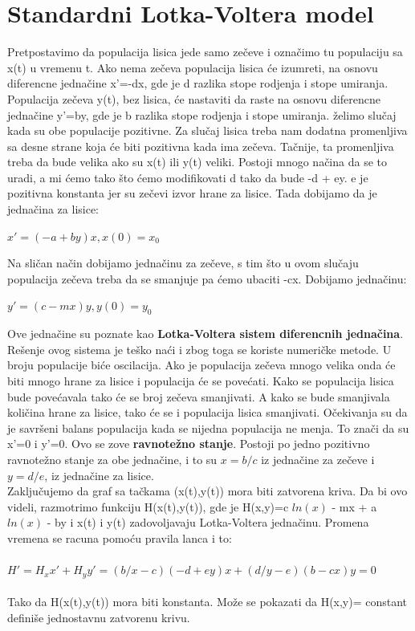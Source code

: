 \documentclass[a4paper]{article}
\begin{document}
\section{Standardni Lotka-Voltera model}
\label{sec:std_model}
Pretpostavimo da populacija lisica jede samo zečeve i označimo
tu populaciju sa x(t) u vremenu t.
Ako nema zečeva populacija lisica će izumreti, na
osnovu diferencne jednačine x'=-dx, gde je d razlika stope rodjenja i stope umiranja.
Populacija zečeva y(t), bez lisica, će nastaviti da raste na osnovu diferencne jednačine y'=by, gde je b razlika stope rodjenja i stope umiranja.
želimo slučaj kada su obe populacije pozitivne. Za slučaj lisica treba nam dodatna promenljiva
sa desne strane koja će biti pozitivna kada ima zečeva. Tačnije, ta promenljiva treba da bude velika ako su
x(t) ili y(t) veliki. Postoji mnogo načina da se to uradi, a mi ćemo tako što ćemo modifikovati d tako da bude
-d + ey. e je pozitivna konstanta jer su zečevi izvor hrane za lisice. Tada dobijamo da je jednačina za lisice:
		\begin{center}
		$x' = (-a + by)x,   x(0)=x_0$
		\end{center}
Na sličan način dobijamo jednačinu za zečeve, s tim što u ovom slučaju populacija zečeva treba da se smanjuje pa ćemo ubaciti -cx. Dobijamo jednačinu: 
		\begin{center}
		$y' = (c - mx)y,  y(0)=y_0$
		\end{center}
Ove jednačine su poznate kao \textbf{Lotka-Voltera sistem diferencnih jednačina}. \\

Rešenje ovog sistema je teško naći i zbog toga se koriste numeričke metode. U broju populacije biće oscilacija.
Ako je populacija zečeva mnogo velika onda će biti mnogo hrane za lisice i populacija će se povećati.
Kako se populacija lisica bude povećavala tako će se broj zečeva smanjivati. A kako se bude smanjivala
količina hrane za lisice, tako će se i populacija lisica smanjivati. Očekivanja su da je savršeni balans populacija
kada se nijedna populacija ne menja. To znači da su  x'=0 i y'=0. Ovo se zove  \textbf{ravnotežno stanje}.
Postoji po jedno pozitivno ravnotežno stanje za obe jednačine, i to su $x=b/c$ iz jednačine za zečeve i $y=d/e$, iz jednačine za lisice.\\ 
Zaključujemo da  graf sa tačkama (x(t),y(t)) mora biti zatvorena kriva.
Da bi ovo videli, razmotrimo funkciju H(x(t),y(t)), gde
je H(x,y)=c $ln(x)$ - mx + a $ln(x)$ - by i x(t) i y(t) zadovoljavaju Lotka-Voltera jednačinu.
Promena vremena se racuna pomoću pravila lanca i to: \\ \\ $H'=H_x x' + H_y y' = (b/x - c)(-d + ey)x + (d/y - e)(b - cx)y = 0$ \\ \\
Tako da  H(x(t),y(t)) mora biti konstanta. Može se pokazati da H(x,y)= constant definiše jednostavnu zatvorenu krivu.
\end{document}
